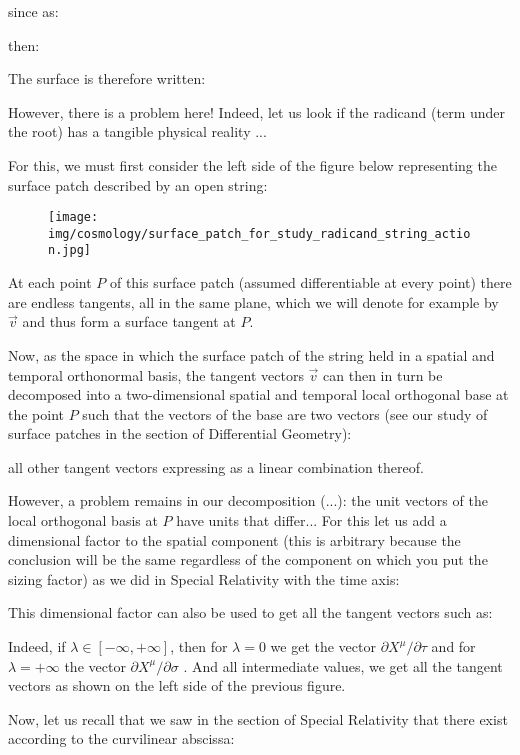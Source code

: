 	since as:
	
	then:
	
	The surface is therefore written:
	
	However, there is a problem here! Indeed, let us look if the radicand (term under the root) has a tangible physical reality ...

	For this, we must first consider the left side of the figure below representing the surface patch described by an open string:
	\begin{figure}[H]
		\begin{center}
		\texttt{[image: img/cosmology/surface\_patch\_for\_study\_radicand\_string\_action.jpg]}
		\end{center}	
	\end{figure}
	At each point $P$ of this surface patch (assumed differentiable at every point) there are endless tangents, all in the same plane, which we will denote for example by $\vec{v}$ and thus form a surface tangent at $P$.

	Now, as the space in which the surface patch of the string held in a spatial and temporal orthonormal basis, the tangent vectors $\vec{v}$ can then in turn be decomposed into a two-dimensional spatial and temporal local orthogonal base at the point $P$ such that the vectors of the base are two vectors (see our study of surface patches in the section of Differential Geometry):
	
	all other tangent vectors expressing as a linear combination thereof.
	
	However, a problem remains in our decomposition (...): the unit vectors of the local orthogonal basis at $P$ have units that differ... For this let us add a dimensional factor  to the spatial component (this is arbitrary because the conclusion will be the same regardless of the component on which you put the sizing factor) as we did in Special Relativity with the time axis:
	
	This dimensional factor can also be used to get all the tangent vectors such as:
	
	Indeed, if $\lambda\in [-\infty,+\infty]$, then for $\lambda=0$ we get the vector $\partial X^\mu/\partial \tau$ and for $\lambda=+\infty$ the vector $\partial X^\mu/\partial \sigma$ . And all intermediate values, we get all the tangent vectors as shown on the left side of the previous figure.

	Now, let us recall that we saw in the section of Special Relativity that there exist according to the curvilinear abscissa:
	
